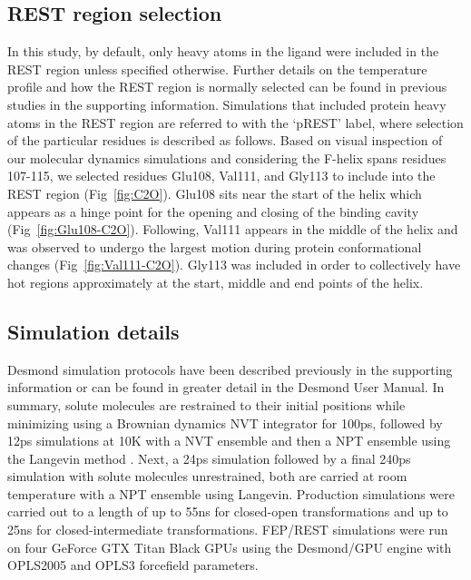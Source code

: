 \documentclass[journal=jctcce,manuscript=article]{achemso}
\begin{document}
\subsection*{REST region selection}
In this study, by default, only heavy atoms in the ligand were included in the REST region unless specified otherwise.
Further details on the temperature profile and how the REST region is normally selected can be found in previous studies\cite{FEP/REST,FEPplus} in the supporting information.
Simulations that included protein heavy atoms in the REST region are referred to with the `pREST' label, where selection of the particular residues is described as follows.
Based on visual inspection of our molecular dynamics simulations and considering the F-helix spans residues 107-115, we selected residues Glu108, Val111, and Gly113 to include into the REST region (Fig~\ref{fig:C2O}).
Glu108 sits near the start of the helix which appears as a hinge point for the opening and closing of the binding cavity (Fig~\ref{fig:Glu108-C2O}).
Following, Val111 appears in the middle of the helix and was observed to undergo the largest motion during protein conformational changes (Fig~\ref{fig:Val111-C2O}).
Gly113 was included in order to collectively have hot regions approximately at the start, middle and end points of the helix.

\subsection*{Simulation details}
Desmond\cite{DESMONDSoftware,DESMONDarticle,DESMONDPaper1,DESMONDPaper2} simulation protocols have been described previously in the supporting information\cite{FEPplus} or can be found in greater detail in the Desmond User Manual\cite{DESMONDManual}.
In summary, solute molecules are restrained to their initial positions while minimizing using a Brownian dynamics NVT integrator for 100ps, followed by 12ps simulations at 10K with a NVT ensemble and then a NPT ensemble using the Langevin method \cite{Langevin}.
Next, a 24ps simulation followed by a final 240ps simulation with solute molecules unrestrained, both are carried at room temperature with a NPT ensemble using Langevin.
Production simulations were carried out to a length of up to 55ns for closed-open transformations and up to 25ns for closed-intermediate transformations.
FEP/REST simulations were run on four GeForce GTX Titan Black GPUs using the Desmond/GPU engine with OPLS2005\cite{OPLS2005} and OPLS3\cite{OPLS3} forcefield parameters.
\end{document}
